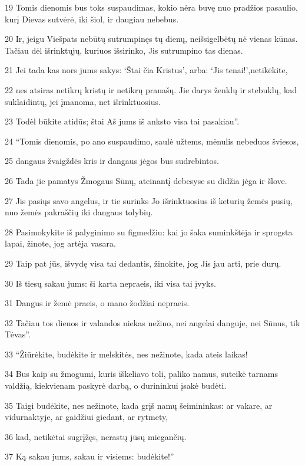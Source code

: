 \par 19 Tomis dienomis bus toks suspaudimas, kokio nėra buvę nuo pradžios pasaulio, kurį Dievas sutvėrė, iki šiol, ir daugiau nebebus. 
\par 20 Ir, jeigu Viešpats nebūtų sutrumpinęs tų dienų, neišsigelbėtų nė vienas kūnas. Tačiau dėl išrinktųjų, kuriuos išsirinko, Jis sutrumpino tas dienas. 
\par 21 Jei tada kas nors jums sakys: ‘Štai čia Kristus’, arba: ‘Jis tenai!’,­netikėkite, 
\par 22 nes atsiras netikrų kristų ir netikrų pranašų. Jie darys ženklų ir stebuklų, kad suklaidintų, jei įmanoma, net išrinktuosius. 
\par 23 Todėl būkite atidūs; štai Aš jums iš anksto visa tai pasakiau”. 
\par 24 “Tomis dienomis, po ano suspaudimo, saulė užtems, mėnulis nebeduos šviesos, 
\par 25 dangaus žvaigždės kris ir dangaus jėgos bus sudrebintos. 
\par 26 Tada jie pamatys Žmogaus Sūnų, ateinantį debesyse su didžia jėga ir šlove. 
\par 27 Jis pasiųs savo angelus, ir tie surinks Jo išrinktuosius iš keturių žemės pusių, nuo žemės pakraščių iki dangaus tolybių. 
\par 28 Pasimokykite iš palyginimo su figmedžiu: kai jo šaka suminkštėja ir sprogsta lapai, žinote, jog artėja vasara. 
\par 29 Taip pat jūs, išvydę visa tai dedantis, žinokite, jog Jis jau arti, prie durų. 
\par 30 Iš tiesų sakau jums: ši karta nepraeis, iki visa tai įvyks. 
\par 31 Dangus ir žemė praeis, o mano žodžiai nepraeis. 
\par 32 Tačiau tos dienos ir valandos niekas nežino, nei angelai danguje, nei Sūnus, tik Tėvas”. 
\par 33 “Žiūrėkite, budėkite ir melskitės, nes nežinote, kada ateis laikas! 
\par 34 Bus kaip su žmogumi, kuris iškeliavo toli, paliko namus, suteikė tarnams valdžią, kiekvienam paskyrė darbą, o durininkui įsakė budėti. 
\par 35 Taigi budėkite, nes nežinote, kada grįš namų šeimininkas: ar vakare, ar vidurnaktyje, ar gaidžiui giedant, ar rytmety, 
\par 36 kad, netikėtai sugrįžęs, nerastų jūsų miegančių. 
\par 37 Ką sakau jums, sakau ir visiems: budėkite!”



